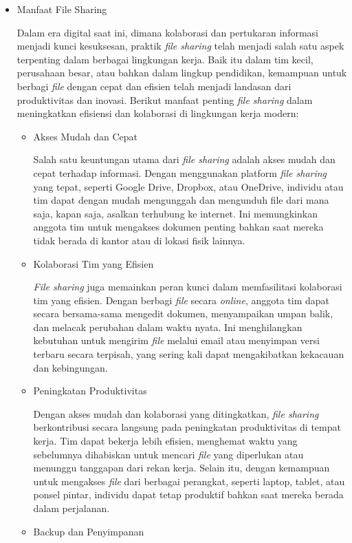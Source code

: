 \documentclass[12pt]{article}
\begin{document}
\begin{itemize}
    \item {Manfaat File Sharing} 
    
    Dalam era digital saat ini, dimana kolaborasi dan pertukaran informasi menjadi kunci kesuksesan, praktik \textit{file sharing} telah menjadi salah satu aspek terpenting dalam berbagai lingkungan kerja. Baik itu dalam tim kecil, perusahaan besar, atau bahkan dalam lingkup pendidikan, kemampuan untuk berbagi \textit{file} dengan cepat dan efisien telah menjadi landasan dari produktivitas dan inovasi.
    Berikut manfaat penting \textit{file sharing} dalam meningkatkan efisiensi dan kolaborasi di lingkungan kerja modern:
    \begin{itemize}
       \item Akses Mudah dan Cepat 
       
        Salah satu keuntungan utama dari \textit{file sharing} adalah akses mudah dan cepat terhadap informasi. Dengan menggunakan platform\textit{ file sharing} yang tepat, seperti Google Drive, Dropbox, atau OneDrive, individu atau tim dapat dengan mudah mengunggah dan mengunduh file dari mana saja, kapan saja, asalkan terhubung ke internet. Ini memungkinkan anggota tim untuk mengakses dokumen penting bahkan saat mereka tidak berada di kantor atau di lokasi fisik lainnya.
        \item Kolaborasi Tim yang Efisien

        \textit{File sharing} juga memainkan peran kunci dalam memfasilitasi kolaborasi tim yang efisien. Dengan berbagi \textit{file }secara \textit{online}, anggota tim dapat secara bersama-sama mengedit dokumen, menyampaikan umpan balik, dan melacak perubahan dalam waktu nyata. Ini menghilangkan kebutuhan untuk mengirim \textit{file} melalui email atau menyimpan versi terbaru secara terpisah, yang sering kali dapat mengakibatkan kekacauan dan kebingungan.
       \item Peningkatan Produktivitas 

       Dengan akses mudah dan kolaborasi yang ditingkatkan, \textit{file sharing} berkontribusi secara langsung pada peningkatan produktivitas di tempat kerja. Tim dapat bekerja lebih efisien, menghemat waktu yang sebelumnya dihabiskan untuk mencari \textit{file} yang diperlukan atau menunggu tanggapan dari rekan kerja. Selain itu, dengan kemampuan untuk mengakses \textit{file} dari berbagai perangkat, seperti laptop, tablet, atau ponsel pintar, individu dapat tetap produktif bahkan saat mereka berada dalam perjalanan.
       \item Backup dan Penyimpanan
       

\end{itemize}
\end{itemize}
\end{document}
